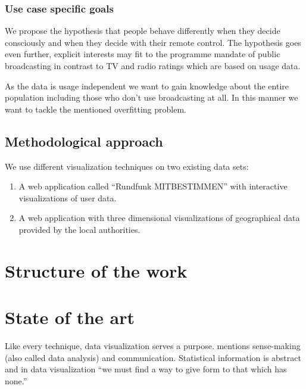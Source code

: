 \documentclass{article}
\begin{document}
\subsubsection{Use case specific goals}
We propose the hypothesis that people behave differently when they decide consciously and when they decide with their remote control.
The hypothesis goes even further, explicit interests may fit to the programme mandate of public broadcasting in contrast to TV and radio ratings which are based on usage data.

As the data is usage independent we want to gain knowledge about the entire population including those who don't use broadcasting at all.
In this manner we want to tackle the mentioned overfitting problem.

\subsection{Methodological approach}

We use different visualization techniques on two existing data sets:
\begin{enumerate}
  \item
    A web application called ``Rundfunk MITBESTIMMEN'' with interactive visualizations of user data.
  \item
    A web application with three dimensional visualizations of geographical data provided by the local authorities.
\end{enumerate}

\section{Structure of the work}


\newpage

\section{State of the art}
Like every technique, data visualization serves a purpose.
\textcite{Few2013} mentions sense-making (also called data analysis) and communication.
Statistical information is abstract and in data visualization ``we must find a way to give form to that which has none.''\cite{Few2013}
\end{document}
